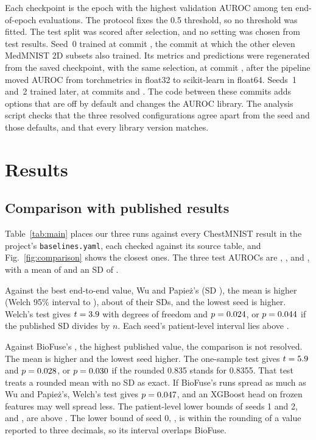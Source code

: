 \documentclass[conference]{IEEEtran}
\begin{document}
Each checkpoint is the epoch with the highest validation AUROC among ten end-of-epoch
evaluations. The protocol fixes the 0.5 threshold, so no threshold was fitted. The test
split was scored after selection, and no setting was chosen from test results. Seed~0
trained at commit \texttt{\commitSeedZero}, the commit at which the other eleven MedMNIST
2D subsets also trained. Its metrics and predictions were regenerated from the saved
checkpoint, with the same selection, at commit \texttt{\commitRescore}, after the pipeline
moved AUROC from torchmetrics in float32 to scikit-learn in float64. Seeds~1 and~2 trained
later, at commits \texttt{\commitSeedOne} and \texttt{\commitSeedTwo}. The code between
these commits adds options that are off by default and changes the AUROC library. The
analysis script checks that the three resolved configurations agree apart from the seed
and those defaults, and that every library version matches.

\section{Results}
\label{sec:results}



\subsection{Comparison with published results}

Table~\ref{tab:main} places our three runs against every ChestMNIST result in the
project's \texttt{baselines.yaml}, each checked against its source table, and
Fig.~\ref{fig:comparison} shows the closest ones. The three test AUROCs are
\testAurocSeedZero{}, \testAurocSeedOne{}, and \testAurocSeedTwo{}, with a mean of
\testAurocMean{} and an SD of \testAurocSD{}.

Against the best end-to-end value, Wu and Papie\.{z}'s \baseWuAuroc{} (SD \baseWuSD{}),
the mean is \gainMeanWu{} higher (Welch 95\% interval \diffWuLo{} to \diffWuHi{}),
about \gainMeanInWuSD{} of their SDs, and the lowest seed is \gainMinSeedWu{} higher. Welch's test gives $t=3.9{}$ with \welchDfWu{}
degrees of freedom and $p=0.024{}$, or $p=0.044{}$ if the published SD divides by
$n$. Each seed's patient-level interval lies above \baseWuAuroc{}.

Against BioFuse's \baseBestAuroc{}, the highest published value, the comparison is not
resolved. The mean is \gainMeanBest{} higher and the lowest seed \gainMinSeedBest{} higher.
The one-sample test gives $t=5.9{}$ and $p=0.028{}$, or
$p=0.030{}$ if the rounded 0.835 stands for 0.8355. That test treats a
rounded mean with no SD as exact. If BioFuse's runs spread as much as Wu and
Papie\.{z}'s, Welch's test gives $p=0.047{}$, and an XGBoost head on frozen
features may well spread less. The patient-level lower bounds of seeds 1 and 2,
\patientAurocLoSeedOne{} and \patientAurocLoSeedTwo{}, are above \baseBestAuroc{}. The lower
bound of seed 0, \patientAurocLoSeedZero{}, is within the rounding of a value reported to
three decimals, so its interval overlaps BioFuse.
\end{document}
